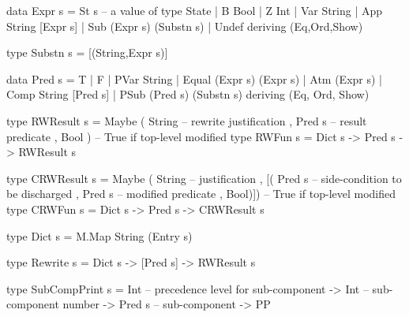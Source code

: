 \label{ha:calc-types-txt}



\begin{code}
data Expr s
 = St s  -- a value of type State
 | B Bool
 | Z Int
 | Var String
 | App String [Expr s]
 | Sub (Expr s) (Substn s)
 | Undef
 deriving (Eq,Ord,Show)

type Substn s = [(String,Expr s)]
\end{code}

\begin{code}
data Pred s
 = T
 | F
 | PVar String
 | Equal (Expr s) (Expr s)
 | Atm (Expr s)
 | Comp String [Pred s]
 | PSub (Pred s) (Substn s)
 deriving (Eq, Ord, Show)
\end{code}
\begin{code}
type RWResult s
 = Maybe ( String  -- rewrite justification
         , Pred s  -- result predicate
         , Bool )  -- True if top-level modified
type RWFun s = Dict s -> Pred s -> RWResult s
\end{code}

\begin{code}
type CRWResult s
 = Maybe ( String      -- justification
         , [( Pred s   -- side-condition to be discharged
            , Pred s   -- modified predicate
            , Bool)])  -- True if top-level modified
type CRWFun s = Dict s -> Pred s -> CRWResult s
\end{code}

\newpage
\begin{code}
type Dict s = M.Map String (Entry s)
\end{code}

\begin{code}
type Rewrite s = Dict s -> [Pred s] -> RWResult s
\end{code}

\begin{code}
type SubCompPrint s
 = Int       -- precedence level for sub-component
   -> Int    -- sub-component number
   -> Pred s -- sub-component
   -> PP
\end{code}

